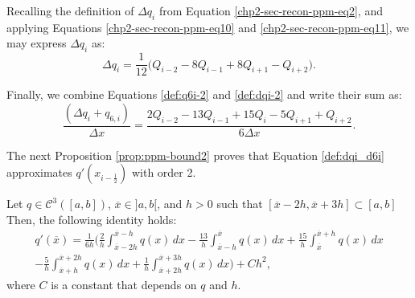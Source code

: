 Recalling the definition of $\Delta q_i$ from Equation \eqref{chp2-sec-recon-ppm-eq2},
and applying Equations \eqref{chp2-sec-recon-ppm-eq10} and \eqref{chp2-sec-recon-ppm-eq11}, 
we may express $\Delta q_i$ as:
\begin{equation}
	\label{def:dqi-2}
	\Delta q_i = \frac{1}{12} \bigg(Q_{i-2} -8Q_{i-1} + 8Q_{i+1} -Q_{i+2} \bigg).
\end{equation}

Finally, we combine Equations \eqref{def:q6i-2} and \eqref{def:dqi-2} and write their sum as:
\begin{equation} 
	\label{def:dqi_d6i}
	\frac{(\Delta q_i + q_{6, i})}{\Delta x} = 
	\frac{2Q_{i-2}-13Q_{i-1} +15Q_i -5Q_{i+1} + Q_{i+2}}{6\Delta x}.
\end{equation}

The next Proposition \ref{prop:ppm-bound2} proves that Equation \eqref{def:dqi_d6i}
approximates $q'(x_{i-\frac{1}{2}})$ with order 2.
\begin{prop}
	\label{prop:ppm-bound2}
	Let $q \in \mathcal{C}^{3}([a,b])$, $\overline{x}\in ]a,b[$,
	and $h>0$ such that $[\overline{x}-2h,\overline{x}+3h] \subset [a,b]$
	Then, the following identity holds:
	\begin{equation}
		\begin{split}
		\label{prop:ppm-bound2-eq1}
		q'(\overline{x} ) = \frac{1}{6h}
		\bigg( \frac{2}{h} \int_{\overline{x}-2h}^{\overline{x}-h} q(x) \,dx 
		      -\frac{13}{h}\int_{\overline{x}-h}^{\overline{x}} q(x) \,dx   
		      +\frac{15}{h}\int_{\overline{x}}^{\overline{x}+h} q(x) \,dx  \\ 
		      -\frac{5}{h} \int_{\overline{x}+h}^{\overline{x}+2h} q(x) \,dx   
		      +\frac{1}{h} \int_{\overline{x}+2h}^{\overline{x}+3h} q(x) \,dx   
		\bigg) + Ch^2,
		\end{split}
	\end{equation}
	where $C$ is a constant that depends on $q$ and $h$.
\end{prop}

